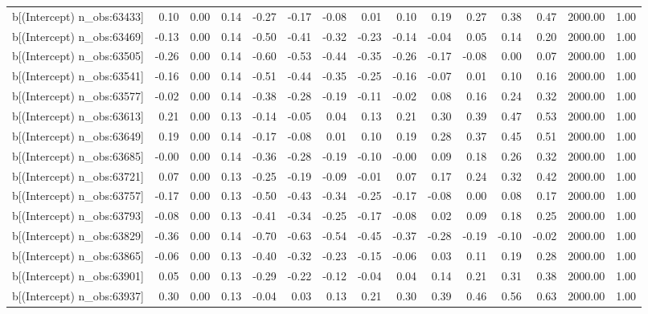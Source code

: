 \begin{table}[ht]
\begin{tabular}{rrrrrrrrrrrrrrr}
  b[(Intercept) n\_obs:63433] & 0.10 & 0.00 & 0.14 & -0.27 & -0.17 & -0.08 & 0.01 & 0.10 & 0.19 & 0.27 & 0.38 & 0.47 & 2000.00 & 1.00 \\ 
  b[(Intercept) n\_obs:63469] & -0.13 & 0.00 & 0.14 & -0.50 & -0.41 & -0.32 & -0.23 & -0.14 & -0.04 & 0.05 & 0.14 & 0.20 & 2000.00 & 1.00 \\ 
  b[(Intercept) n\_obs:63505] & -0.26 & 0.00 & 0.14 & -0.60 & -0.53 & -0.44 & -0.35 & -0.26 & -0.17 & -0.08 & 0.00 & 0.07 & 2000.00 & 1.00 \\ 
  b[(Intercept) n\_obs:63541] & -0.16 & 0.00 & 0.14 & -0.51 & -0.44 & -0.35 & -0.25 & -0.16 & -0.07 & 0.01 & 0.10 & 0.16 & 2000.00 & 1.00 \\ 
  b[(Intercept) n\_obs:63577] & -0.02 & 0.00 & 0.14 & -0.38 & -0.28 & -0.19 & -0.11 & -0.02 & 0.08 & 0.16 & 0.24 & 0.32 & 2000.00 & 1.00 \\ 
  b[(Intercept) n\_obs:63613] & 0.21 & 0.00 & 0.13 & -0.14 & -0.05 & 0.04 & 0.13 & 0.21 & 0.30 & 0.39 & 0.47 & 0.53 & 2000.00 & 1.00 \\ 
  b[(Intercept) n\_obs:63649] & 0.19 & 0.00 & 0.14 & -0.17 & -0.08 & 0.01 & 0.10 & 0.19 & 0.28 & 0.37 & 0.45 & 0.51 & 2000.00 & 1.00 \\ 
  b[(Intercept) n\_obs:63685] & -0.00 & 0.00 & 0.14 & -0.36 & -0.28 & -0.19 & -0.10 & -0.00 & 0.09 & 0.18 & 0.26 & 0.32 & 2000.00 & 1.00 \\ 
  b[(Intercept) n\_obs:63721] & 0.07 & 0.00 & 0.13 & -0.25 & -0.19 & -0.09 & -0.01 & 0.07 & 0.17 & 0.24 & 0.32 & 0.42 & 2000.00 & 1.00 \\ 
  b[(Intercept) n\_obs:63757] & -0.17 & 0.00 & 0.13 & -0.50 & -0.43 & -0.34 & -0.25 & -0.17 & -0.08 & 0.00 & 0.08 & 0.17 & 2000.00 & 1.00 \\ 
  b[(Intercept) n\_obs:63793] & -0.08 & 0.00 & 0.13 & -0.41 & -0.34 & -0.25 & -0.17 & -0.08 & 0.02 & 0.09 & 0.18 & 0.25 & 2000.00 & 1.00 \\ 
  b[(Intercept) n\_obs:63829] & -0.36 & 0.00 & 0.14 & -0.70 & -0.63 & -0.54 & -0.45 & -0.37 & -0.28 & -0.19 & -0.10 & -0.02 & 2000.00 & 1.00 \\ 
  b[(Intercept) n\_obs:63865] & -0.06 & 0.00 & 0.13 & -0.40 & -0.32 & -0.23 & -0.15 & -0.06 & 0.03 & 0.11 & 0.19 & 0.28 & 2000.00 & 1.00 \\ 
  b[(Intercept) n\_obs:63901] & 0.05 & 0.00 & 0.13 & -0.29 & -0.22 & -0.12 & -0.04 & 0.04 & 0.14 & 0.21 & 0.31 & 0.38 & 2000.00 & 1.00 \\ 
  b[(Intercept) n\_obs:63937] & 0.30 & 0.00 & 0.13 & -0.04 & 0.03 & 0.13 & 0.21 & 0.30 & 0.39 & 0.46 & 0.56 & 0.63 & 2000.00 & 1.00 \\ 

\end{tabular}
\end{table}
